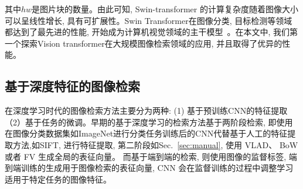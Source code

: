 其中$hw$是图片块的数量。由此可知, Swin-transformer 的计算复杂度随着图像大小可以呈线性增长, 具有可扩展性。Swin Transformer在图像分类, 目标检测等领域都达到了最先进的性能, 开始成为计算机视觉领域的主干模型~\cite{tianyonglin22,xsx2022,cyf2023,sxf2023,yuhang2021,  jfh2021, wfp2022,  liu2021swinnet,liu2022video, huang2022swin, cao2021swin, ma2022swinfusion}。在本文中, 我们第一个探索Vision transformer在大规模图像检索领域的应用, 并且取得了优异的性能。

\subsection{基于深度特征的图像检索}
在深度学习时代的图像检索方法主要分为两种: (1) 基于预训练CNN的特征提取 （2）基于任务的微调。早期的基于深度学习的检索方法基于两阶段检索, 即使用在图像分类数据集如ImageNet进行分类任务训练后的CNN代替基于人工的特征提取方法,如SIFT, 进行特征提取, 第二阶段如Sec.~\ref{sec:manual}, 使用 VLAD、 BoW 或者 FV 生成全局的表征向量。 而基于端到端的检索, 则使用图像的监督标签, 端到端训练的生成用于图像检索的表征向量, CNN 会在监督训练的过程中调整学习适用于特定任务的图像特征。

